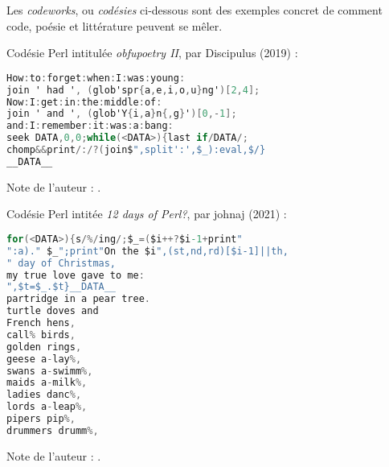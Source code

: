 \documentclass[12pt]{article} %
\begin{document}
Les \textit{codeworks}, ou \textit{codésies} ci-dessous sont des exemples concret de comment code, poésie et littérature peuvent se mêler.

Codésie Perl intitulée \textit{obfupoetry II}, par Discipulus (2019) :
\begin{lstlisting}[language=C, caption={}, label={codework:obfupoetry}]
How:to:forget:when:I:was:young:
join ' had ', (glob'spr{a,e,i,o,u}ng')[2,4];
Now:I:get:in:the:middle:of:
join ' and ', (glob'Y{i,a}n{,g}')[0,-1];
and:I:remember:it:was:a:bang:
seek DATA,0,0;while(<DATA>){last if/DATA/;
chomp&&print/:/?(join$",split':',$_):eval,$/}
__DATA__
\end{lstlisting}
Note de l'auteur :  \cite{codework-obfupoetryII}.

\newpage
Codésie Perl intitée \textit{12 days of Perl?}, par johnaj (2021) :
\begin{lstlisting}[language=C, caption={}, label={codework:12daysPerl}]
for(<DATA>){s/%/ing/;$_=($i++?$i-1+print"
":a)." $_";print"On the $i",(st,nd,rd)[$i-1]||th,
" day of Christmas,
my true love gave to me:
",$t=$_.$t}__DATA__
partridge in a pear tree.
turtle doves and
French hens,
call% birds,
golden rings,
geese a-lay%,
swans a-swimm%,
maids a-milk%,
ladies danc%,
lords a-leap%,
pipers pip%,
drummers drumm%,
\end{lstlisting}
Note de l'auteur :  \cite{codework-12DaysOfPerl}.
\end{document}
